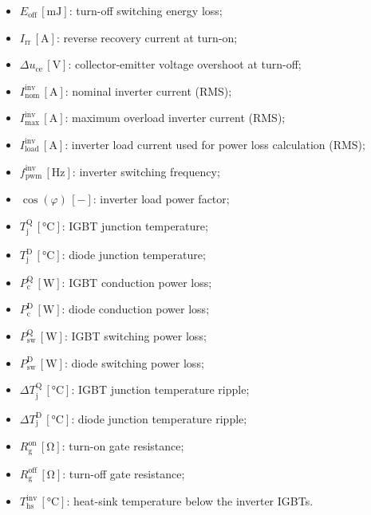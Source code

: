 \documentclass[12pt,a4paper]{scrartcl}
\begin{document}
\begin{itemize}
	\item[--] $E_\text{off}$\,$\left[\si{\milli\joule}\right]$: turn-off switching energy loss;
	\item[--] $I_\text{rr}$\,$\left[\si{\ampere}\right]$: reverse recovery current at turn-on;
	\item[--] $\Delta u_\text{ce}$\,$\left[\si{\volt}\right]$: collector-emitter voltage overshoot at turn-off;
	\item[--] $I_\text{nom}^\text{inv}$\,$\left[\si{\ampere}\right]$: nominal inverter current (RMS);
	\item[--] $I_\text{max}^\text{inv}$\,$\left[\si{\ampere}\right]$: maximum overload inverter current (RMS);
	\item[--] $I_\text{load}^\text{inv}$\,$\left[\si{\ampere}\right]$: inverter load current used for power loss calculation (RMS);
	\item[--] $f_\text{pwm}^\text{inv}$\,$\left[\si{\hertz}\right]$: inverter switching frequency;
	\item[--] $\cos(\varphi)$\,$\left[-\right]$: inverter load power factor;
	\item[--] $T_\text{j}^\text{Q}$\,$\left[\si{\celsius}\right]$: IGBT junction temperature;
	\item[--] $T_\text{j}^\text{D}$\,$\left[\si{\celsius}\right]$: diode junction temperature;
	\item[--] $P_\text{c}^\text{Q}$\,$\left[\si{\watt}\right]$: IGBT conduction power loss;
	\item[--] $P_\text{c}^\text{D}$\,$\left[\si{\watt}\right]$: diode conduction power loss;
	\item[--] $P_\text{sw}^\text{Q}$\,$\left[\si{\watt}\right]$: IGBT switching power loss;
	\item[--] $P_\text{sw}^\text{D}$\,$\left[\si{\watt}\right]$: diode switching power loss;
	\item[--] $\Delta T_\text{j}^\text{Q}$\,$\left[\si{\celsius}\right]$: IGBT junction temperature ripple;
	\item[--] $\Delta T_\text{j}^\text{D}$\,$\left[\si{\celsius}\right]$: diode junction temperature ripple;
	\item[--] $R_\text{g}^\text{on}$\,$\left[\si{\ohm}\right]$: turn-on gate resistance;
	\item[--] $R_\text{g}^\text{off}$\,$\left[\si{\ohm}\right]$: turn-off gate resistance;
	\item[--] $T_\text{hs}^\text{inv}$\,$\left[\si{\celsius}\right]$: heat-sink temperature below the inverter IGBTs.
\end{itemize}
\newpage
\end{document}
